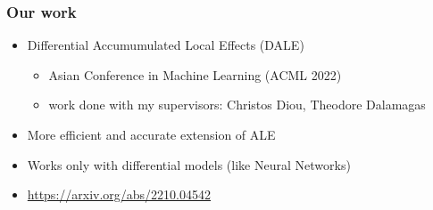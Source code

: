 \documentclass{beamer}
\begin{document}
\begin{frame}
  \frametitle{Our work}

  \begin{itemize}
  \item Differential Accumumulated Local Effects (DALE)
    \begin{itemize}
    \item Asian Conference in Machine Learning (ACML 2022)
    \item work done with my supervisors:
      Christos Diou, Theodore Dalamagas
    \end{itemize}
  \item More efficient and accurate extension of ALE
  \item Works only with differential models (like Neural Networks)
  \item \href{https://arxiv.org/abs/2210.04542}{https://arxiv.org/abs/2210.04542}
  \end{itemize}
\end{frame}
\end{document}

